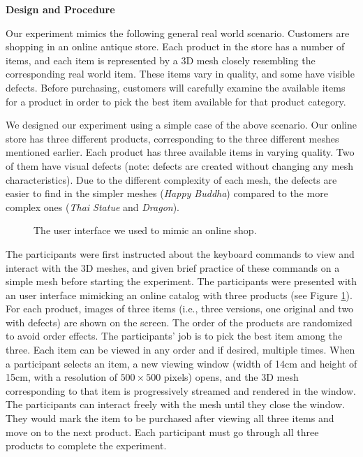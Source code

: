 \textbf{Design and Procedure}

Our experiment mimics the following general real world scenario. Customers
are shopping in an online antique store. Each product in the store has a
number of items, and each item is represented by a 3D mesh closely resembling
the corresponding real world item. These items vary in quality, and some
have visible defects. Before purchasing, customers will carefully examine the
available items for a product in order to pick the best item available for
that product category.

We designed our experiment using a simple case of the above scenario. 
Our online store has three different products,
corresponding to the three different meshes mentioned earlier. Each product
has three available items in varying quality. Two of them have visual
defects (note: defects are created without changing any mesh
characteristics). Due to the different complexity of each mesh, the defects
are easier to find in the simpler meshes (\textit{Happy Buddha}) compared to the more
complex ones (\textit{Thai Statue} and \textit{Dragon}).

\begin{figure}
    \centering
    \caption{The user interface we used to mimic an online shop.}
    \label{f:user:shop}
\end{figure}
The participants were first instructed about the keyboard commands 
to view and interact with the 3D meshes, and given brief practice of
these commands on a simple mesh before starting the experiment. The
participants were presented with an user interface mimicking an online
catalog with three products (see Figure \ref{f:user:shop}).  For each product, images of three items 
(i.e., three versions, one original and two with defects) are shown on the screen.
The order of the products are randomized to avoid order effects.
The participants' job is to pick the best item among the three. Each item 
can be viewed in any order and if desired, multiple times.  When 
a participant selects an item, a new viewing window (width of 14cm and
height of 15cm, with a resolution of $500 \times 500$ pixels) opens, and the 3D mesh corresponding to that item is
progressively streamed and rendered in the window.  
The participants can interact freely
with the mesh until they close the window.
They would mark the item to be purchased after viewing all three items and
move on to the next product. Each participant must go through all three products to
complete the experiment.

